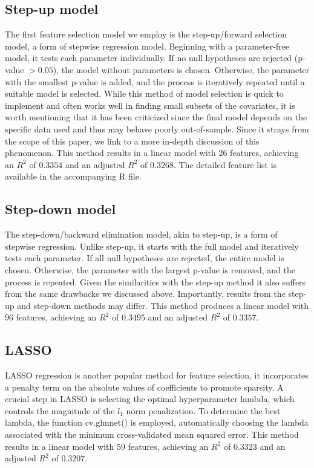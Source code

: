 \documentclass[hidelinks,12pt]{article}
\begin{document}
\subsection{Step-up model}
The first feature selection model we employ is the step-up/forward selection model, a form of stepwise regression model. Beginning with a parameter-free model, it tests each parameter individually. If no null hypotheses are rejected (p-value $> 0.05$), the model without parameters is chosen. Otherwise, the parameter with the smallest p-value is added, and the process is iteratively repeated until a suitable model is selected. While this method of model selection is quick to implement and often works well in finding small subsets of the covariates, it is worth mentioning that it has been criticized since the final model depends on the specific data used and thus may behave poorly out-of-sample. Since it strays from the scope of this paper, we link to a more in-depth discussion of this phenomenon\cite{Smith2018-uf}.
This method results in a linear model with $26$ features, achieving an $R^2$ of $0.3354$ and an adjusted $R^2$ of $0.3268$. The detailed feature list is available in the accompanying R file.

\subsection{Step-down model}
The step-down/backward elimination model, akin to step-up, is a form of stepwise regression. Unlike step-up, it starts with the full model and iteratively tests each parameter. If all null hypotheses are rejected, the entire model is chosen. Otherwise, the parameter with the largest p-value is removed, and the process is repeated. Given the similarities with the step-up method it also suffers from the same drawbacks we discussed above\cite{Smith2018-uf}. Importantly, results from the step-up and step-down methods may differ.
This method produces a linear model with 96 features, achieving an $R^2$ of $0.3495$ and an adjusted $R^2$ of $0.3357$.

\subsection{LASSO}
LASSO regression is another popular method for feature selection, it incorporates a penalty term on the absolute values of coefficients to promote sparsity. A crucial step in LASSO is selecting the optimal hyperparameter lambda, which controls the magnitude of the $l_1$ norm penalization. To determine the best lambda, the function cv.glmnet() is employed, automatically choosing the lambda associated with the minimum cross-validated mean squared error.
This method results in a linear model with $59$ features, achieving an $R^2$ of $0.3323$ and an adjusted $R^2$ of $0.3207$.
\end{document}

